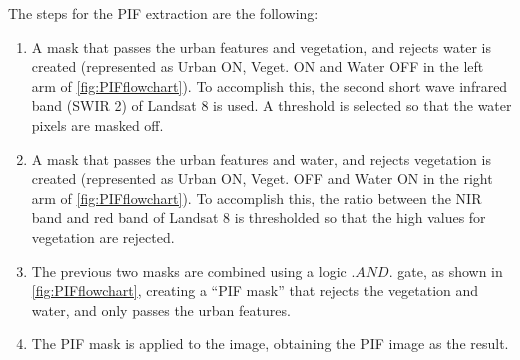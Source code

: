 \documentclass[onecolumn,3p,letterpaper]{elsarticle}
\begin{document}
The steps for the PIF extraction are the following:
\begin{enumerate}\itemsep10pt
	\item A mask that passes the urban features and vegetation, and rejects water is created (represented as Urban ON, Veget. ON and Water OFF in the left arm of \autoref{fig:PIFflowchart}). To accomplish this, the second short wave infrared band (SWIR 2) of Landsat 8 is used. A threshold is selected so that the water pixels are masked off.
	\item A mask that passes the urban features and water, and rejects vegetation is created (represented as Urban ON, Veget. OFF and Water ON in the right arm of \autoref{fig:PIFflowchart}). To accomplish this, the ratio between the NIR band and red band of Landsat 8 is thresholded so that the high values for vegetation are rejected.
	\item The previous two masks are combined using a logic $.AND.$ gate, as shown in \autoref{fig:PIFflowchart}, creating a ``PIF mask'' that rejects the vegetation and water, and only passes the urban features.
	\item The PIF mask is applied to the image, obtaining the PIF image as the result.

\end{enumerate}
\end{document}
